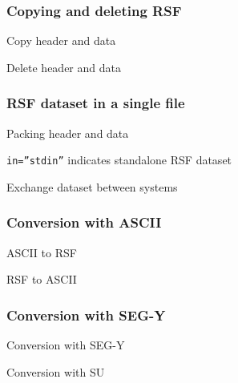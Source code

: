 \begin{frame}
  \frametitle{Copying and deleting RSF}
  
  \begin{block}{Copy header and data}
  \end{block}
  
  
  \begin{block}{Delete header and data}
  \end{block}
  
\end{frame}

\begin{frame}
  \frametitle{RSF dataset in a single file}
  \begin{block}{Packing header and data}
  \end{block}
  
  \texttt{in=\textquotedblright stdin\textquotedblright} indicates standalone RSF dataset
  \begin{block}{Exchange dataset between systems}
  \end{block}
\end{frame}

\begin{frame}
  \frametitle{Conversion with ASCII}
  
  \begin{block}{ASCII to RSF}
  \end{block}
  
  
  \begin{block}{RSF to ASCII}
  \end{block}
  
\end{frame}

\begin{frame}
  \frametitle{Conversion with SEG-Y}
  
  \begin{block}{Conversion with SEG-Y}
     \\
  \end{block}
  
  \begin{block}{Conversion with SU}
     \\
  \end{block}
\end{frame}


